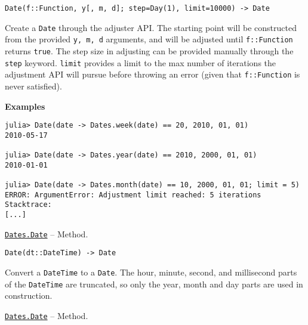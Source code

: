 \begin{adjustwidth}{2em}{0pt}


\begin{verbatim}
Date(f::Function, y[, m, d]; step=Day(1), limit=10000) -> Date
\end{verbatim}

Create a \texttt{Date} through the adjuster API. The starting point will be constructed from the provided \texttt{y, m, d} arguments, and will be adjusted until \texttt{f::Function} returns \texttt{true}. The step size in adjusting can be provided manually through the \texttt{step} keyword. \texttt{limit} provides a limit to the max number of iterations the adjustment API will pursue before throwing an error (given that \texttt{f::Function} is never satisfied).

\textbf{Examples}


\begin{verbatim}
julia> Date(date -> Dates.week(date) == 20, 2010, 01, 01)
2010-05-17

julia> Date(date -> Dates.year(date) == 2010, 2000, 01, 01)
2010-01-01

julia> Date(date -> Dates.month(date) == 10, 2000, 01, 01; limit = 5)
ERROR: ArgumentError: Adjustment limit reached: 5 iterations
Stacktrace:
[...]
\end{verbatim}



\end{adjustwidth}
\hypertarget{2036888574814255715}{}
\hyperlink{2036888574814255715}{\texttt{Dates.Date}}  -- {Method.}

\begin{adjustwidth}{2em}{0pt}


\begin{verbatim}
Date(dt::DateTime) -> Date
\end{verbatim}

Convert a \texttt{DateTime} to a \texttt{Date}. The hour, minute, second, and millisecond parts of the \texttt{DateTime} are truncated, so only the year, month and day parts are used in construction.



\end{adjustwidth}
\hypertarget{4338057079258419}{}
\hyperlink{4338057079258419}{\texttt{Dates.Date}}  -- {Method.}

